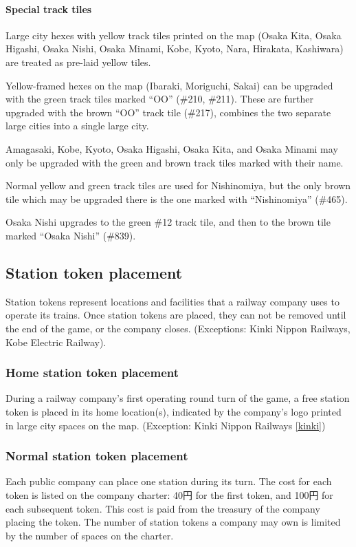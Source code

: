 \documentclass{article}
\begin{document}
\begin{CJK}{UTF8}{min}
\begin{multicols}{2}
\paragraph{Special track tiles}
Large city hexes with yellow track tiles printed on the map (Osaka Kita,
Osaka Higashi, Osaka Nishi, Osaka Minami, Kobe, Kyoto, Nara, Hirakata,
Kashiwara) are treated as pre-laid yellow tiles.

Yellow-framed hexes on the map (Ibaraki, Moriguchi, Sakai) can be
upgraded with the green track tiles marked ``OO'' (\#210, \#211). These
are further upgraded with the brown ``OO'' track tile (\#217), combines
the two separate large cities into a single large city.

Amagasaki, Kobe, Kyoto, Osaka Higashi, Osaka Kita, and Osaka Minami
may only be upgraded with the green and brown track tiles marked with
their name.

Normal yellow and green track tiles are used for Nishinomiya, but the
only brown tile which may be upgraded there is the one marked with
``Nishinomiya'' (\#465).

Osaka Nishi upgrades to the green \#12 track tile, and then to the
brown tile marked ``Osaka Nishi'' (\#839).

\subsection{Station token placement}
Station tokens represent locations and facilities that a railway
company uses to operate its trains. Once station tokens are placed,
they can not be removed until the end of the game, or the company
closes. (Exceptions: Kinki Nippon Railways, Kobe Electric Railway).

\subsubsection{Home station token placement}
\label{or-home-station}
During a railway company's first operating round turn of the game, a
free station token is placed in its home location(s), indicated by the
company's logo printed in large city spaces on the map. (Exception:
Kinki Nippon Railways \ref{kinki})

\subsubsection{Normal station token placement} \label{or-normal-stations}
Each public company can place one station during its turn. The cost
for each token is listed on the company charter: 40円 for the first
token, and 100円 for each subsequent token. This cost is paid from
the treasury of the company placing the token. The number of station tokens
a company may own is limited by the number of spaces on the charter.


\end{multicols}
\end{CJK}
\end{document}
